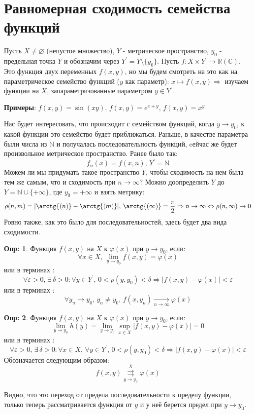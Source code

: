 \documentclass[12pt]{article}
\newcommand{\RN}[1]{%
	\textup{\uppercase\expandafter{\romannumeral#1}}%
}
\newcommand{\MR}{\mathbb{R}}
\newcommand{\MC}{\mathbb{C}}
\newcommand{\MN}{\mathbb{N}}
\newcommand{\VN}{\varnothing}
\newcommand{\VE}{\varepsilon}
\theoremstyle{definition}
\newtheorem{defn}{Опр:}
\newcommand{\uconvm}[2]{\overset{#1}{\underset{#2}{\rightrightarrows}}}
\begin{document}
\lhead{Математический анализ - \RN{3}}
\section*{Равномерная сходимость семейства функций}
Пусть $X \neq \VN$ (непустое множество), $Y$ - метрическое пространство, $y_0$ - предельная точка $Y$ и обозначим через $Y^\prime = Y \setminus \{y_0\}$. Пусть $f \colon X \times Y^\prime \to \MR (\MC)$. Это функция двух переменных $f(x,y)$, но мы будем смотреть на это как на параметрическое семейство функций ($y$ как параметр): $x \mapsto f(x,y) \Rightarrow$  изучаем функции на $X$, запараметризованные параметром $y \in Y^\prime$.

\textbf{Примеры}: $f(x,y) = 	\sin{(xy)}, \, f(x,y) = e^{x + y}, \, f(x,y) = x^y$

Нас будет интересовать, что происходит с семейством функций, когда $y \to y_0$, к какой функции это семейство будет приближаться. Раньше, в качестве параметра были числа из $\MN$ и получалась последовательность функций, cейчас же будет произвольное метрическое пространство. Ранее было так: 
$$
	f_n(x) = f(x,n), \, Y^\prime = \MN
$$ 
Можем ли мы придумать такое пространство $Y$, чтобы сходимость на нем была тем же самым, что и сходимость при  $n \to \infty$? Можно доопределить $Y$ до $Y = \MN \cup \{+\infty\}$, где $y_0 = +\infty$ и взять метрику:
$$
	\rho(n,m) = |\arctg{(n)} - \arctg{(m)}|, \, \arctg{(\infty)} = \dfrac{\pi}{2} \Rightarrow n \to \infty \Leftrightarrow \rho(n, \infty) \to 0 
$$
Ровно также, как это было для последовательностей, здесь будет два вида сходимости.

\begin{defn}
	Функция $f(x,y)$  на $X$ к $\varphi(x)$ при $y \to y_0$, если:
	$$
		\forall x \in X, \, \lim\limits_{y \to y_0} f(x,y) = \varphi(x)
	$$
	или в терминах :
	$$
		\forall \VE > 0, \, \exists \, \delta > 0 \colon \forall y \in Y^\prime, \, 0 < \rho(y,y_0) < \delta \Rightarrow |f(x,y) - \varphi(x)| < \VE
	$$
	или в терминах :
	$$
		\forall y_n \to y_0, \, y_n \neq y_0, \, f(x,y_n) \xrightarrow[n \to \infty]{}\varphi(x)
	$$
\end{defn}

\begin{defn}
	Функция $f(x,y)$  на $X$ к $\varphi(x)$ при $y \to y_0$, если:
	$$
		\lim\limits_{y \to y_0}h(y) = \lim\limits_{y \to y_0}\sup\limits_{x \in X}|f(x,y) - \varphi(x)| = 0
	$$
	или в терминах :
	$$
		\forall \VE > 0, \, \exists \, \delta > 0 \colon \forall x \in X, \, \forall y \in Y^\prime, \, 0 < \rho(y,y_0) < \delta \Rightarrow |f(x,y) - \varphi(x)| < \VE
	$$
	Обозначается следующим образом: 
	$$
		f(x,y) \uconvm{X}{y \to y_0} \varphi(x)
	$$
\end{defn}
Видно, что это переход от предела последовательности к пределу функции, только теперь рассматривается функция от $y$ и у неё берется предел при $y \to y_0$.
\end{document}

